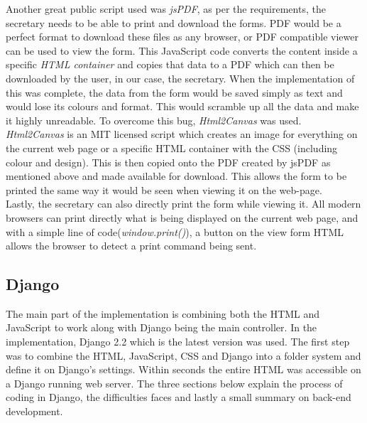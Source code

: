 \documentclass[../main.tex]{subfiles}
\begin{document}
Another great public script used was \textit{jsPDF}\cite{jsPDF}, as per the requirements, the secretary needs to be able to print and download the forms. PDF would be a perfect format to download these files as any browser, or PDF compatible viewer can be used to view the form. This JavaScript code converts the content inside a specific \textit{HTML container} and copies that data to a PDF which can then be downloaded by the user, in our case, the secretary. When the implementation of this was complete, the data from the form would be saved simply as text and would lose its colours and format. This would scramble up all the data and make it highly unreadable. To overcome this bug, \textit{Html2Canvas} was used. \\[4mm]

\textit{Html2Canvas}\cite{htmlcanvas} is an MIT licensed script which creates an image for everything on the current web page or a specific HTML container with the CSS (including colour and design). This is then copied onto the PDF created by jsPDF as mentioned above and made available for download. This allows the form to be printed the same way it would be seen when viewing it on the web-page. \\[4mm]

Lastly, the secretary can also directly print the form while viewing it. All modern browsers can print directly what is being displayed on the current web page, and with a simple line of code(\textit{window.print()}), a button on the view form HTML allows the browser to detect a print command being sent. 


\subsection{Django}
The main part of the implementation is combining both the HTML and JavaScript to work along with Django being the main controller. In the implementation, Django 2.2\cite{djangoLatest} which is the latest version was used. The first step was to combine the HTML, JavaScript, CSS and Django into a folder system and define it on Django's settings. Within seconds the entire HTML was accessible on a Django running web server. The three sections below explain the process of coding in Django, the difficulties faces and lastly a small summary on back-end development. 
\end{document}
